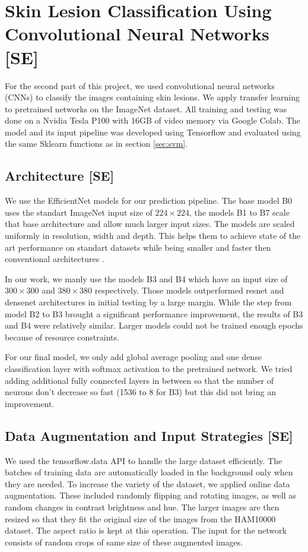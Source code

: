 
\section{Skin Lesion Classification Using Convolutional Neural Networks [SE]}\label{sec:cnn}
For the second part of this project, we used convolutional neural networks (CNNs) to classify the images containing skin lesions. 
We apply transfer learning to pretrained networks on the ImageNet dataset. All training and testing was done on a Nvidia Tesla P100 with 16GB of video memory via Google Colab. The model and its input pipeline was developed using Tensorflow and evaluated using the same Sklearn functions as in section \ref{sec:svm}. 
\subsection{Architecture [SE]}
We use the EfficientNet models for our prediction pipeline.
The base model B0 uses the standart ImageNet input size of $224 \times 224$, the models B1 to B7 scale that base architecture and allow much larger input sizes. The models are scaled uniformly in resolution, width and depth. This helps them to achieve state of the art performance on standart datasets while being smaller and faster then conventional architectures \cite{tan2019efficientnet}.

In our work, we manly use the models B3 and B4 which have an input size of $300 \times 300$ and $380 \times 380$ respectively. 
Those models outperformed resnet and densenet architectures in initial testing by a large margin. While the step from model B2 to B3 brought a significant performance improvement, the results of B3 and B4 were relatively similar. Larger models could not be trained enough epochs because of resource constraints.

For our final model, we only add global average pooling and one dense classification layer with softmax activation to the pretrained network. We tried adding additional fully connected layers in between so that the number of neurons don't decrease so fast (1536 to 8 for B3) but this did not bring an improvement. 

\subsection{Data Augmentation and Input Strategies [SE]}\label{sub:cnn_input}
We used the tensorflow.data API to handle the large dataset efficiently. The batches of training data are automatically loaded in the background only when they are needed. 
To increase the variety of the dataset, we applied online data augmentation. These included randomly flipping and rotating images, as well as random changes in contrast brightness and hue. The larger images are then resized so that they fit the original size of the images from the HAM10000 dataset. The aspect ratio is kept at this operation. 
The input for the network consists of random crops of same size of these augmented images. 

